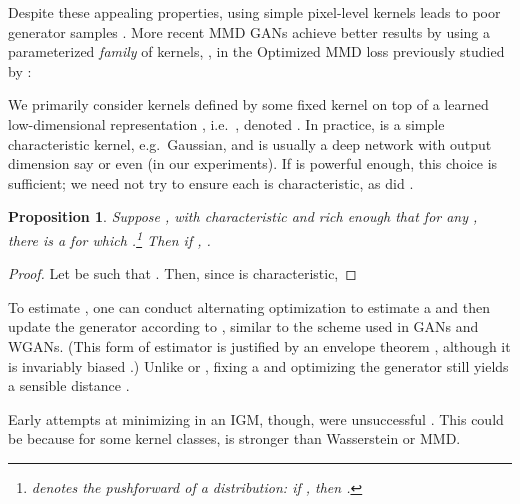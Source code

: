 \documentclass{article}
\let\citep\parencite
\newtheorem{prop}[lem]{Proposition}
\begin{document}
Despite these appealing properties,
using simple pixel-level kernels leads to poor generator samples \parencite{gen-mmd,gmmn,opt-mmd,Bottou:2017}.
More recent MMD GANs \parencite{mmd-gan,cramer-gan,Binkowski:2018}
achieve better results by using a parameterized \emph{family} of kernels, ,
in the Optimized MMD loss
previously studied by \cite{kernel-choice-mmd,opt-est-probabilities}:










We primarily consider kernels defined by some fixed kernel 
on top of a learned low-dimensional representation ,
i.e.\ ,
denoted .
In practice,
 is a simple characteristic kernel, e.g.\ Gaussian,
and  is usually a deep network
with output dimension say  \citep{Binkowski:2018} or even  (in our experiments).
If  is powerful enough, this choice is sufficient;
we need not try to ensure each  is characteristic, as did \cite{mmd-gan}.
\begin{prop} \label{prop:optmmd:strict}
  Suppose ,
  with  characteristic
  and  rich enough that
  for any ,
  there is a  for which .\footnote{
     denotes the \emph{pushforward} of a distribution:
    if , then .}
  Then if , .
\end{prop}
\vspace*{-3mm}
\begin{proof}
  Let  be such that .
  Then, since  is characteristic,
  
\end{proof}
\vspace*{-3mm}
To estimate ,
one can conduct alternating optimization to estimate a 
and then update the generator according to ,
similar to the scheme used in GANs and WGANs.
(This form of estimator is justified by an envelope theorem \citep{envelope-thm},
although it is invariably biased \parencite{Binkowski:2018}.)
Unlike  or , fixing a  and optimizing the generator still yields a sensible distance .

Early attempts at minimizing  in an IGM, though, were unsuccessful \parencite[footnote 7]{opt-mmd}.
This could be because for some kernel classes,
 is stronger than Wasserstein or MMD.
\end{document}
